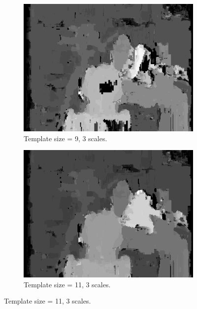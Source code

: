 \documentclass[12pt,a4paper,oneside,final]{article}
\begin{document}
\begin{table}[H]
\begin{subtable}{1\textwidth}
\begin{figure}[H]
\begin{subfigure}[b]{0.24\textwidth}
			\includegraphics[width=\textwidth]{disparity_s3_k9set_1.png}
			\caption{Template size = 9, 3 scales.}
		\end{subfigure}
		\begin{subfigure}[b]{0.24\textwidth}
			\includegraphics[width=\textwidth]{disparity_s3_k11set_1.png}
			\caption{Template size = 11, 3 scales.}
		\end{subfigure}
	\end{figure}
	\begin{figure}[H]
		\ContinuedFloat
		\begin{subfigure}[b]{0.24\textwidth}

\end{subfigure}
\end{figure}
\end{subtable}
\end{table}
\end{document}
